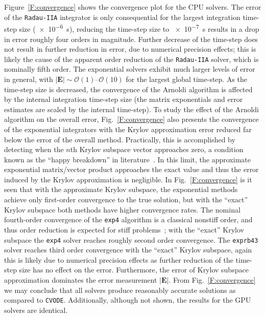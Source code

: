\documentclass[preprint]{elsarticle}
\begin{document}
Figure~\ref{F:convergence} shows the convergence plot for the CPU solvers.
The error of the \texttt{Radau-IIA} integrator is only consequential for the largest integration time-step size (\SI{e-6}{\second}), reducing the time-step size to \SI{e-7}{\second} results in a drop in error roughly four orders in magnitude.
Further decrease of the time-step does not result in further reduction in error, due to numerical precision effects; this is likely the cause of the apparent order reduction of the \texttt{Radau-IIA} solver, which is nominally fifth order.
The exponential solvers exhibit much larger levels of error in general, with $\left\lvert\textbf{E}\right\rvert \sim \mathcal{O}(1)\text{--}\mathcal{O}(10)$ for the largest global time-step.
As the time-step size is decreased, the convergence of the Arnoldi algorithm is affected by the internal integration time-step size (the matrix exponentials and error estimates are scaled by the internal time-step).
To study the effect of the Arnoldi algorithm on the overall error, Fig.~\ref{F:convergence} also presents the convergence of the exponential integrators with the Krylov approximation error reduced far below the error of the overall method.
Practically, this is accomplished by detecting when the $n$th Krylov subspace vector approaches zero, a condition known as the ``happy breakdown'' in literature~\cite{datta2010numerical}.
In this limit, the approximate exponential matrix\slash vector product approaches the exact value and thus the error induced by the Krylov approximation is negligible.
In Fig.~\ref{F:convergence} is it seen that with the approximate Krylov subspace, the exponential methods achieve only first-order convergence to the true solution, but with the ``exact'' Krylov subspace both methods have higher convergence rates.
The nominal fourth-order convergence of the \texttt{exp4} algorithm is a classical nonstiff order, and thus order reduction is expected for stiff problems~\cite{ANU:7701740,Bisetti:2012jw}; with the ``exact'' Krylov subspace the \texttt{exp4} solver reaches roughly second order convergence.
The \texttt{exprb43} solver reaches third order convergence with the ``exact'' Krylov subspace, again this is likely due to numerical precision effects as further reduction of the time-step size has no effect on the error.
Furthermore, the error of Krylov subspace approximation dominates the error measurement $\lvert\textbf{E}\rvert$.
From Fig.~\ref{F:convergence} we may conclude that all solvers produce reasonably accurate solutions as compared to \texttt{CVODE}.
Additionally, although not shown, the results for the GPU solvers are identical.
\end{document}
